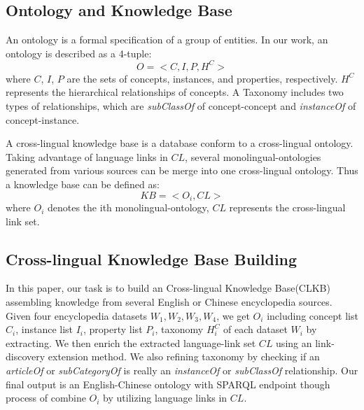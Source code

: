\documentclass[runningheads,a4paper]{llncs}
\begin{document}
\subsection{Ontology and Knowledge Base}

An ontology is a formal specification of a group of entities. In our work, an ontology is described as a 4-tuple:
\begin{equation}
    O = <C,I,P,H^C>
\end{equation}
where $C$, $I$, $P$ are the sets of concepts, instances, and properties, respectively. $H^C$ represents the hierarchical relationships of concepts. A Taxonomy includes two types of relationships, which are \textit{subClassOf} of concept-concept and \textit{instanceOf} of concept-instance.

A cross-lingual knowledge base is a database conform to a cross-lingual ontology. Taking advantage of language links in $CL$, several monolingual-ontologies generated from various sources can be merge into one cross-lingual ontology.  Thus a knowledge base can be defined as:
\begin{equation}
    KB = <O_{i}, CL>
\end{equation}
where $O_{i}$ denotes the ith monolingual-ontology, $CL$ represents the cross-lingual link set.

\subsection{Cross-lingual Knowledge Base Building}
In this paper, our task is to build an Cross-lingual Knowledge Base(CLKB) assembling knowledge from several English or Chinese encyclopedia sources. Given four encyclopedia datasets $W_{1},W_{2},W_{3},W_{4}$, we get $O_{i}$ including concept list $C_{i}$, instance list $I_{i}$, property list $P_{i}$, taxonomy $H^C_{i}$ of each dataset $W_{i}$ by extracting. We then enrich the extracted language-link set $CL$ using an link-discovery extension method. We also refining taxonomy by checking if an \textit{articleOf} or \textit{subCategoryOf} is really an \textit{instanceOf} or \textit{subClassOf} relationship. Our final output is an English-Chinese ontology  with SPARQL endpoint though process of combine $O_{i}$ by utilizing language links in $CL$. 
\end{document}
